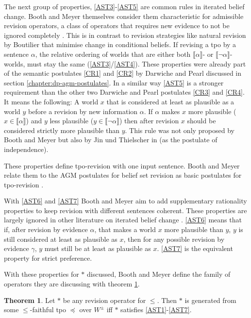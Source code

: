 \documentclass[english, 12pt]{scrartcl}
\theoremstyle{definition}
\theoremstyle{definition}
\theoremstyle{definition}
\newtheorem{theorem}{Theorem}
\newcommand{\modelsOf}[1]{\llbracket #1 \rrbracket}
\begin{document}
The next group of properties, \ref{AST3}-\ref{AST5} are common rules in iterated belief change. Booth and Meyer themselves consider them characteristic for admissible revision operators, a class of operators that requires new evidence to not be ignored completely \cite{Booth2006a}. This is in contrast to revision strategies like natural revision by Boutilier \cite{Boutilier1996} that minimise change in conditional beliefs.
If revising a tpo by a sentence $\alpha$, the relative ordering of worlds that are either both $\modelsOf{\alpha}$- or $\modelsOf{\neg\alpha}$-worlds, must stay the same (\ref{AST3}/\ref{AST4}). These properties were already part of the semantic postulates \ref{CR1} and \ref{CR2} by Darwiche and Pearl \cite{Darwiche1997} discussed in section \ref{chapter:dp-agm-postulates}.
In a similar way \ref{AST5} is a stronger requirement than the other two Darwiche and Pearl postulates \ref{CR3} and \ref{CR4}. It means the following: A world $x$ that is considered at least as plausible as a world $y$ before a revision by new information $\alpha$. If $\alpha$ makes $x$ more plausible ($x \in \modelsOf{\alpha}$) and $y$ less plausible ($y \in \modelsOf{\neg\alpha}$) then after revision $x$ should be considered strictly more plausible than $y$. This rule was not only proposed by Booth and Meyer \cite{Booth2006a} but also by Jin und Thielscher in \cite{Jin2007} (as the postulate of independence).

These properties define tpo-revision with one input sentence. Booth and Meyer relate them to the AGM postulates for belief set revision \cite{Alchourron1985} as basic postulates for tpo-revision \cite{Booth2011}.

With \ref{AST6} and \ref{AST7} Booth and Meyer aim to add supplementary rationality properties to keep revision with different sentences coherent. These properties are largely ignored in other literature on iterated belief change \cite{Booth2011}. \ref{AST6} means that if, after revision by evidence $\alpha$, that makes a world $x$ more plausible than $y$, $y$ is still considered at least as plausible as $x$, then for any possible revision by evidence $\gamma$, $y$ must still be at least as plausible as $x$. \ref{AST7} is the equivalent property for strict preference.

\bigskip

With these properties for $\ast$ discussed, Booth and Meyer define the family of operators they are discussing with theorem \ref{theorem:revision-operator}.

\begin{theorem}
\label{theorem:revision-operator}Let $\ast$ be any revision operator for $\leq$. Then $\ast$ is generated from some $\leq$-faithful tpo $\preceq$ over $W^{\pm}$ iff $\ast$ satisfies \ref{AST1}-\ref{AST7}. \cite{Booth2011}
\end{theorem}
\end{document}
